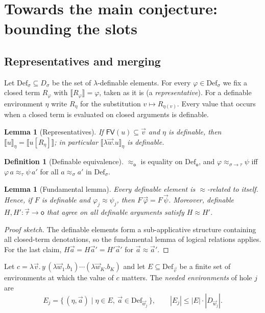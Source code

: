 \documentclass[11pt]{article}
\newcommand{\Ground}{\mathsf{o}\xspace}
\newcommand{\FV}{\mathsf{FV}\xspace}
\newcommand{\sem}[1]{\llbracket #1\rrbracket}
\newcommand{\Def}{\mathrm{Def}}
\newtheorem{lemma}[theorem]{Lemma}
\theoremstyle{definition}
\newtheorem{definition}[theorem]{Definition}
\begin{document}
\section{Towards the main conjecture: bounding the slots}\label{sec:bounding}

\subsection{Representatives and merging}\label{sec:merge}

Let $\Def_\sigma\subseteq D_\sigma$ be the set of $\lambda$-definable
elements.  For every $\varphi\in\Def_\sigma$ we fix a closed term
$R_\varphi$ with $\sem{R_\varphi}=\varphi$, taken as it is (a
\emph{representative}).  For a definable environment $\eta$ write $R_\eta$
for the substitution $v\mapsto R_{\eta(v)}$.  Every value that occurs
when a closed term is evaluated on closed arguments is definable.

\begin{lemma}[Representatives]\label{lem:repr}
If $\FV(u)\subseteq\vec v$ and $\eta$ is definable, then
$\sem u_\eta=\sem{u[R_\eta]}$; in particular $\sem{\lambda\vec w.u}_\eta$
is definable.
\end{lemma}

\begin{definition}[Definable equivalence]
$\approx_\Ground$ is equality on $\Def_\Ground$, and
$\varphi\approx_{\sigma\to\tau}\psi$ iff $\varphi\,a\approx_\tau\psi\,a'$
for all $a\approx_\sigma a'$ in $\Def_\sigma$.
\end{definition}

\begin{lemma}[Fundamental lemma]\label{lem:fundamental}
Every definable element is $\approx$-related to itself.  Hence, if $F$ is
definable and $\varphi_j\approx\psi_j$, then $F\,\vec\varphi=F\,\vec\psi$.
Moreover, definable $H,H':\vec\tau\to\Ground$ that agree on all definable
arguments satisfy $H\approx H'$.
\end{lemma}
\begin{proof}[Proof sketch]
The definable elements form a sub-applicative structure containing all
closed-term denotations, so the fundamental lemma of logical relations
applies.  For the last claim, $H\vec a=H\vec a'=H'\vec a'$ for
$\vec a\approx\vec a'$.
\end{proof}

Let $c=\lambda\vec v.\,y\,(\lambda\vec w_1.b_1)\cdots(\lambda\vec w_K.b_K)$
and let $E\subseteq\Def_{\vec v}$ be a finite set of environments at which
the value of $c$ matters.  The \emph{needed environments} of hole $j$ are
\[
  E_j=\{\,(\eta,\vec a)\mid\eta\in E,\ \vec a\in\Def_{\vec w_j}\,\},
  \qquad |E_j|\le|E|\cdot|D_{\vec w_j}|.
\]
\end{document}
